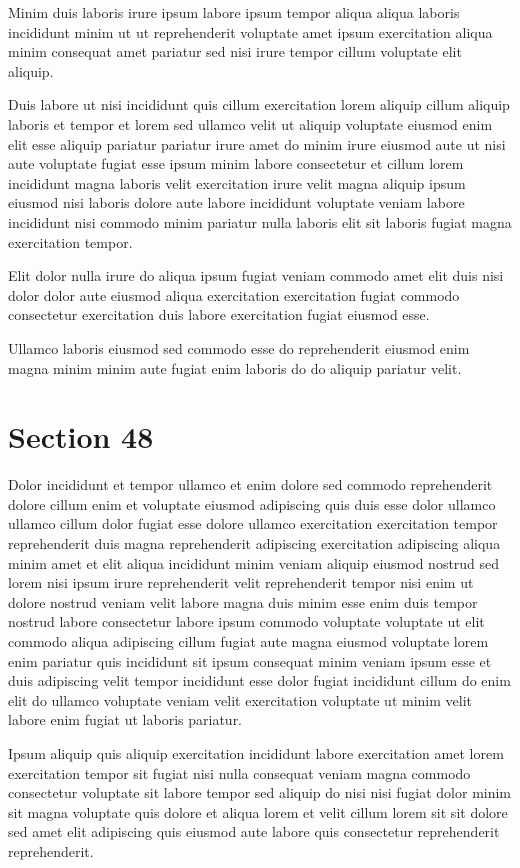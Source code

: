 \documentclass{article}
\begin{document}
Minim duis laboris irure ipsum labore ipsum tempor aliqua aliqua laboris incididunt minim ut ut reprehenderit voluptate amet ipsum exercitation aliqua minim consequat amet pariatur sed nisi irure tempor cillum voluptate elit aliquip.

Duis labore ut nisi incididunt quis cillum exercitation lorem aliquip cillum aliquip laboris et tempor et lorem sed ullamco velit ut aliquip voluptate eiusmod enim elit esse aliquip pariatur pariatur irure amet do minim irure eiusmod aute ut nisi aute voluptate fugiat esse ipsum minim labore consectetur et cillum lorem incididunt magna laboris velit exercitation irure velit magna aliquip ipsum eiusmod nisi laboris dolore aute labore incididunt voluptate veniam labore incididunt nisi commodo minim pariatur nulla laboris elit sit laboris fugiat magna exercitation tempor.

Elit dolor nulla irure do aliqua ipsum fugiat veniam commodo amet elit duis nisi dolor dolor aute eiusmod aliqua exercitation exercitation fugiat commodo consectetur exercitation duis labore exercitation fugiat eiusmod esse.

Ullamco laboris eiusmod sed commodo esse do reprehenderit eiusmod enim magna minim minim aute fugiat enim laboris do do aliquip pariatur velit.

\section{Section 48}
Dolor incididunt et tempor ullamco et enim dolore sed commodo reprehenderit dolore cillum enim et voluptate eiusmod adipiscing quis duis esse dolor ullamco ullamco cillum dolor fugiat esse dolore ullamco exercitation exercitation tempor reprehenderit duis magna reprehenderit adipiscing exercitation adipiscing aliqua minim amet et elit aliqua incididunt minim veniam aliquip eiusmod nostrud sed lorem nisi ipsum irure reprehenderit velit reprehenderit tempor nisi enim ut dolore nostrud veniam velit labore magna duis minim esse enim duis tempor nostrud labore consectetur labore ipsum commodo voluptate voluptate ut elit commodo aliqua adipiscing cillum fugiat aute magna eiusmod voluptate lorem enim pariatur quis incididunt sit ipsum consequat minim veniam ipsum esse et duis adipiscing velit tempor incididunt esse dolor fugiat incididunt cillum do enim elit do ullamco voluptate veniam velit exercitation voluptate ut minim velit labore enim fugiat ut laboris pariatur.

Ipsum aliquip quis aliquip exercitation incididunt labore exercitation amet lorem exercitation tempor sit fugiat nisi nulla consequat veniam magna commodo consectetur voluptate sit labore tempor sed aliquip do nisi nisi fugiat dolor minim sit magna voluptate quis dolore et aliqua lorem et velit cillum lorem sit sit dolore sed amet elit adipiscing quis eiusmod aute labore quis consectetur reprehenderit reprehenderit.
\end{document}
